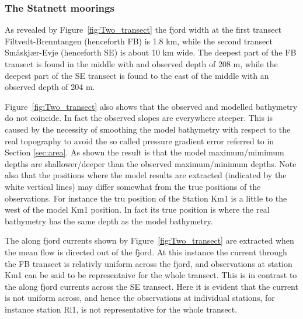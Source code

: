 \subsubsection{The Statnett moorings}
\label{subsubsec:filtve}
As revealed by Figure~\ref{fig:Two_transect} the fjord width at the first transect Filtvedt-Brenntangen (henceforth FB) is 1.8 km, while the second transect Sm{\aa}skj{\ae}r-Evje (henceforth SE) is about 10 km wide. The deepest part of the FB transect is found in the middle with and observed depth of 208 m, while the deepest part of the SE transect is found to the east of the middle with an observed depth of 204 m.  

Figure~\ref{fig:Two_transect} also shows that the observed and modelled bathymetry do not coincide. In fact the observed slopes are everywhere steeper. This is caused by the necessity of smoothing the model bathymetry with respect to the real topography to avoid the so called pressure gradient error referred to in Section \ref{sec:area}. As shown the result is that the model maximum/mimimum depths are shallower/deeper than the observed maximum/minimum depths. Note also that the positions where the model results are extracted (indicated by the white vertical lines) may differ somewhat from the true positions of the observations. For instance the tru position of the Station Km1 is a little to the west of the model Km1 position. In fact its true position is where the real bathymetry has the same depth as the model bathymetry.


The along fjord currents shown by Figure~\ref{fig:Two_transect} are extracted when the mean flow is directed out of the fjord. At this instance the current through the FB transect is relativly uniform across the fjord, and observations at station Km1 can be said to be representaive for the whole transect. This is in contrast to the along fjord currents across the SE transect. Here it is evident that the current is not uniform across, and hence the observations at individual stations, for instance station Rl1, is not representative for the whole transect.

